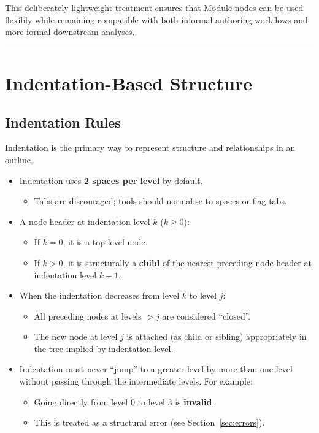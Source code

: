 \documentclass[11pt]{article}
\begin{document}
This deliberately lightweight treatment ensures that Module nodes can be used
flexibly while remaining compatible with both informal authoring workflows and
more formal downstream analyses.


\bigskip
\hrule
\bigskip

\section{Indentation-Based Structure}

\subsection{Indentation Rules}

Indentation is the primary way to represent structure and relationships in an outline.

\begin{itemize}[leftmargin=2em]
  \item Indentation uses \textbf{2 spaces per level} by default.
  \begin{itemize}[leftmargin=1.5em]
    \item Tabs are discouraged; tools should normalise to spaces or flag tabs.
  \end{itemize}

  \item A node header at indentation level \(k\) (\(k \geq 0\)):
  \begin{itemize}[leftmargin=1.5em]
    \item If \(k = 0\), it is a top-level node.
    \item If \(k > 0\), it is structurally a \textbf{child} of the nearest preceding node header at indentation level \(k - 1\).
  \end{itemize}

  \item When the indentation decreases from level \(k\) to level \(j\):
  \begin{itemize}[leftmargin=1.5em]
    \item All preceding nodes at levels \(> j\) are considered ``closed''.
    \item The new node at level \(j\) is attached (as child or sibling) appropriately in the tree implied by indentation level.
  \end{itemize}

  \item Indentation must never ``jump'' to a greater level by more than one level without passing through the intermediate levels. For example:
  \begin{itemize}[leftmargin=1.5em]
    \item Going directly from level 0 to level 3 is \textbf{invalid}.
    \item This is treated as a structural error (see Section~\ref{sec:errors}).
  \end{itemize}
\end{itemize}
\end{document}
